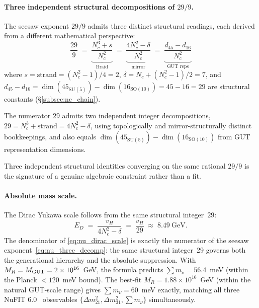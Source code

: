 \documentclass[11pt]{article}
\theoremstyle{remark}
\begin{document}
\paragraph{Three independent structural decompositions of $29/9$.}
The seesaw exponent $29/9$ admits three distinct structural readings, each derived from a different mathematical perspective:
\begin{equation}
\frac{29}{9} \;=\;
\underbrace{\frac{N_c^3 + s}{N_c^2}}_{\text{Braid}} \;=\;
\underbrace{\frac{4N_c^2 - \delta}{N_c^2}}_{\text{mirror}} \;=\;
\underbrace{\frac{d_{45} - d_{16}}{N_c^2}}_{\text{GUT reps}}
\label{eq:nu_three_decomp}
\end{equation}
where $s = \mathrm{strand} = (N_c^2{-}1)/4 = 2$, $\delta = N_c + (N_c^2{-}1)/2 = 7$, and $d_{45} - d_{16} = \dim(45_{\mathrm{SU}(5)}) - \dim(16_{\mathrm{SO}(10)}) = 45 - 16 = 29$ are structural constants (\S\ref{subsec:nc_chain}).

\smallskip
The numerator $29$ admits two independent integer decompositions, $29 = N_c^3 + \mathrm{strand} = 4N_c^2 - \delta$, using topologically and mirror-structurally distinct bookkeepings, and also equals $\dim(45_{\mathrm{SU}(5)}) - \dim(16_{\mathrm{SO}(10)})$ from GUT representation dimensions.

Three independent structural identities converging on the same rational $29/9$ is the signature of a genuine algebraic constraint rather than a fit.

\paragraph{Absolute mass scale.}
The Dirac Yukawa scale follows from the same structural integer~$29$:
\begin{equation}
E_D \;=\; \frac{v_H}{4N_c^2 - \delta} \;=\; \frac{v_H}{29} \;\approx\; 8.49~\mathrm{GeV}.
\label{eq:nu_dirac_scale}
\end{equation}
The denominator of \eqref{eq:nu_dirac_scale} is exactly the numerator of the seesaw exponent~\eqref{eq:nu_three_decomp}: the same structural integer~29 governs both the generational hierarchy and the absolute suppression. With $M_R = M_{\rm GUT} = 2 \times 10^{16}$~GeV, the formula predicts $\sum m_\nu = 56.4$~meV (within the Planck $<\!120$~meV bound). The best-fit $M_R = 1.88\times 10^{16}$~GeV (within the natural GUT-scale range) gives $\sum m_\nu = 60$~meV exactly, matching all three NuFIT 6.0~\cite{NuFIT60} observables $\{\Delta m^2_{21}, \Delta m^2_{31}, \sum m_\nu\}$ simultaneously.
\end{document}
